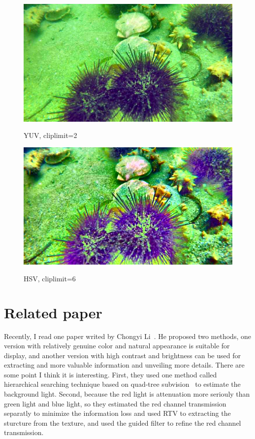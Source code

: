 \documentclass[10pt,twocolumn,letterpaper]{article}
\begin{document}
	\begin{figure}[htbp]
			\centering{}
			\includegraphics[width=0.9\linewidth]{76.jpg}\\
			\caption{YUV, cliplimit=2}
			\label{yuv}
	\end{figure}
	\begin{figure}[htbp]
			\centering{}
			\includegraphics[width=0.9\linewidth]{076.jpg}\\
			\caption{HSV, cliplimit=6}
			\label{hsv6}
	\end{figure}
	\section{Related paper}
	\par Recently, I read one paper writed by Chongyi Li~\cite{li2016underwater}. He proposed two methods, one version with relatively genuine color and natural appearance is suitable for display, and another version with high contrast and brightness can be used for extracting and more valuable information and unveiling more details. There are some point I think it is interesting. First, they used one method called hierarchical searching technique based on quad-tree subvision~\cite{kim2013optimized} to estimate the background light. Second, because the red light is attenuation more seriouly than green light and blue light, so they estimated the red channel transmission separatly to minimize the information loss and used RTV to extracting the sturcture from the texture, and used the guided filter to refine the red channel transmission.
	
	
\end{document}
